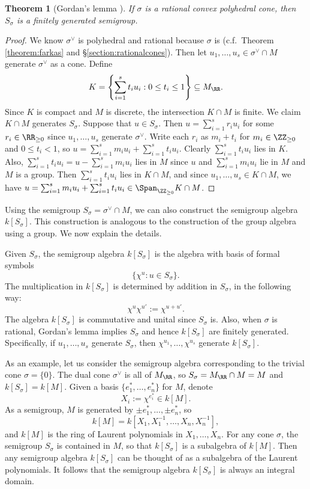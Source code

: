 \documentclass[12pt]{amsart}
\theoremstyle{plain}
\newtheorem{theorem}{Theorem}[subsection]
\theoremstyle{definition}
\begin{document}
\begin{theorem}[Gordan's lemma {\cite[\S 1.2]{Fulton93}}]\label{gordanslemma}
If $\sigma$ is a rational convex polyhedral cone, then $S_\sigma$ is a finitely generated semigroup.
\end{theorem}
\begin{proof}
We know $\sigma^\vee$ is polyhedral and rational because $\sigma$ is (c.f.\ Theorem \ref{theorem:farkas} and \S \ref{section:rationalcones}).
Then let $u_1, \ldots, u_s \in \sigma^\vee \cap M$ generate $\sigma^\vee$ as a cone.
Define
$$K = \left\{\sum_{i=1}^s t_i u_i : 0 \le t_i \le 1\right\} \subseteq M_\RR.$$
Since $K$ is compact and $M$ is discrete, the intersection $K \cap M$ is finite.
We claim $K \cap M$ generates $S_\sigma$.
Suppose that $u \in S_\sigma$.
Then $u =\sum_{i=1}^s r_i u_i$ for some $r_i \in \RR_{\ge 0}$ since $u_1, \ldots, u_s$ generate $\sigma^\vee$.
Write each $r_i$ as $m_i + t_i$ for $m_i \in \ZZ_{\ge 0}$ and $0 \le t_i < 1$, so $u = \sum_{i=1}^s m_i u_i + \sum_{i=1}^s t_i u_i$.
Clearly $\sum_{i=1}^s t_i u_i$ lies in $K$.
Also, $\sum_{i=1}^s t_i u_i = u - \sum_{i=1}^s m_i u_i$ lies in $M$ since $u$ and $\sum_{i=1}^s m_i u_i$ lie in $M$ and $M$ is a group.
Then $\sum_{i=1}^s t_i u_i$ lies in $K \cap M$, and since $u_1, \ldots, u_s \in K \cap M$, we have $u = \sum_{i=1}^s m_i u_i + \sum_{i=1}^s t_i u_i \in \Span_{\ZZ_{\ge 0}} K \cap M$.
\end{proof}

Using the semigroup $S_\sigma = \sigma^\vee \cap M$, we can also construct the semigroup algebra $k[S_\sigma]$.
This construction is analogous to the construction of the group algebra using a group.
We now explain the details.

Given $S_\sigma$, the semigroup algebra $k[S_\sigma]$ is the algebra with basis of formal symbols
$$\{\chi^u : u \in S_\sigma\}.$$
The multiplication in $k[S_\sigma]$ is determined by addition in $S_\sigma$, in the following way:
$$\chi^u \chi^{u'} := \chi^{u + u'}.$$
The algebra $k[S_\sigma]$ is commutative and unital since $S_\sigma$ is.
Also, when $\sigma$ is rational, Gordan's lemma implies $S_\sigma$ and hence $k[S_\sigma]$ are finitely generated.
Specifically, if $u_1, \ldots, u_s$ generate $S_\sigma$, then $\chi^{u_1}, \ldots, \chi^{u_s}$ generate $k[S_\sigma]$.

As an example, let us consider the semigroup algebra corresponding to the trivial cone $\sigma = \{0\}$.
The dual cone $\sigma^\vee$ is all of $M_\RR$, so $S_\sigma = M_\RR \cap M = M$ and $k[S_\sigma]=k[M]$. 
Given a basis $\{e_1^*, \ldots, e_n^*\}$ for $M$, denote
$$X_i := \chi^{e_i^*} \in k[M].$$
As a semigroup, $M$ is generated by $\pm e_1^*, \ldots, \pm e_n^*$, so
$$k[M] = k[X_1, X_1^{-1}, \ldots, X_n, X_n^{-1}],$$
and $k[M]$ is the ring of Laurent polynomials in $X_1, \ldots, X_n$.
For any cone $\sigma$, the semigroup $S_\sigma$ is contained in $M$, so that $k[S_\sigma]$ is a subalgebra of $k[M]$. 
Then any semigroup algebra $k[S_\sigma]$ can be thought of as a subalgebra of the Laurent polynomials.
It follows that the semigroup algebra $k[S_\sigma]$ is always an integral domain.
\end{document}
